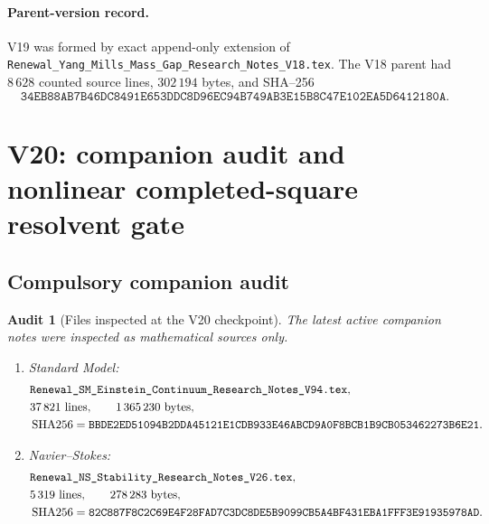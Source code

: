 \documentclass[11pt,oneside]{book}
\newtheorem{audit}[theorem]{Audit}
\theoremstyle{definition}
\theoremstyle{remark}
\begin{document}
\paragraph{Parent-version record.}
V19 was formed by exact append-only extension of
\texttt{Renewal\_Yang\_Mills\_Mass\_Gap\_Research\_Notes\_V18.tex}.
The V18 parent had \(8\,628\) counted source lines,
\(302\,194\) bytes, and SHA--256
\[
\texttt{34EB88AB7B46DC8491E653DDC8D96EC94B749AB3E15B8C47E102EA5D6412180A}.
\]



\section{V20: companion audit and nonlinear completed-square
resolvent gate}
\label{sec:e8v20}

\subsection{Compulsory companion audit}

\begin{audit}[Files inspected at the V20 checkpoint]
\label{audit:e8v20-companion}
The latest active companion notes were inspected as mathematical
sources only.
\begin{enumerate}
\item Standard Model:
\[
\begin{split}
&\texttt{Renewal\_SM\_Einstein\_Continuum\_Research\_Notes\_V94.tex},\\
&37\,821\ {\rm lines},\qquad1\,365\,230\ {\rm bytes},\\
&\operatorname{SHA256}=
\texttt{BBDE2ED51094B2DDA45121E1CDB933E46ABCD9A0F8BCB1B9CB053462273B6E21}.
\end{split}
\]
\item Navier--Stokes:
\[
\begin{split}
&\texttt{Renewal\_NS\_Stability\_Research\_Notes\_V26.tex},\\
&5\,319\ {\rm lines},\qquad278\,283\ {\rm bytes},\\
&\operatorname{SHA256}=
\texttt{82C887F8C2C69E4F28FAD7C3DC8DE5B9099CB5A4BF431EBA1FFF3E91935978AD}.
\end{split}
\]
\end{enumerate}
\end{audit}
\end{document}
